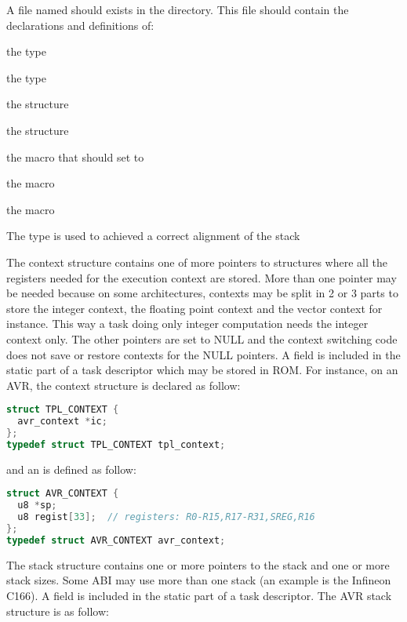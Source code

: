 A file named  should exists in the  directory. This file should contain the declarations and definitions of:

\begin{pitemize}
\item the  type
\item the  type
\item the  structure
\item the  structure
\item the  macro that should set to 
\item the  macro
\item the  macro
\end{pitemize}

The  type is used to achieved a correct alignment of the stack

The  context structure contains one of more pointers to structures where all the registers needed for the execution context are stored.
More than one pointer may be needed because on some architectures, contexts may be split in 2 or 3 parts to store the integer context, the floating point context and the vector context for instance.
This way a task doing only integer computation needs the integer context only.
The other pointers are set to NULL and the context switching code does not save or restore contexts for the NULL pointers.
A  field is included in the static part of a task descriptor which may be stored in ROM.
For instance, on an AVR, the context structure is declared as follow:

\begin{lstlisting}[language=C]
struct TPL_CONTEXT {
  avr_context *ic;
};
typedef struct TPL_CONTEXT tpl_context;
\end{lstlisting}

and an  is defined as follow:

\begin{lstlisting}[language=C]
struct AVR_CONTEXT {
  u8 *sp;
  u8 regist[33];  // registers: R0-R15,R17-R31,SREG,R16
};
typedef struct AVR_CONTEXT avr_context;
\end{lstlisting}

The  stack structure contains one or more pointers to the stack and one or more stack sizes. Some ABI may use more than one stack (an example is the Infineon C166). A  field is included in the static part of a task descriptor. The AVR stack structure is as follow:

